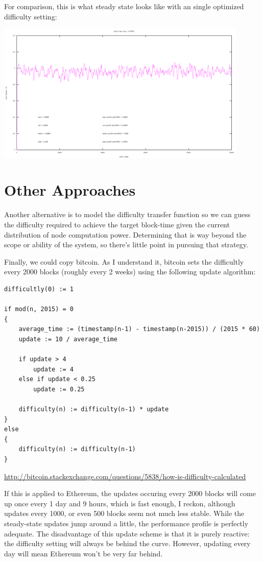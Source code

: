 \documentclass[10pt,a4paper]{article}
\begin{document}
\newpage

For comparison, this is what steady state looks like with an single optimized difficulty setting:
\begin{center}
\includegraphics[width=12cm]{SimulationGraphs/simulation_avg-500_upd-none.png}
\end{center}

\section*{Other Approaches}
	Another alternative is to model the difficulty transfer function so we can guess the difficulty required to achieve the target block-time given the current distribution of node computation power. Determining that is way beyond the scope or ability of the system, so there's little point in pursuing that strategy. 
	
	Finally, we could copy bitcoin. As I understand it, bitcoin sets the difficultly every 2000 blocks (roughly every 2 weeks) using the following update algorithm:
	
\begin{verbatim}
difficultly(0) := 1

if mod(n, 2015) = 0
{
    average_time := (timestamp(n-1) - timestamp(n-2015)) / (2015 * 60)
    update := 10 / average_time
	
    if update > 4
        update := 4
    else if update < 0.25
        update := 0.25
        
    difficulty(n) := difficulty(n-1) * update 
}
else
{
    difficulty(n) := difficulty(n-1)
}
\end{verbatim}

\url{http://bitcoin.stackexchange.com/questions/5838/how-is-difficulty-calculated}

\newpage

If this is applied to Ethereum, the updates occuring every 2000 blocks will come up once every 1 day and 9 hours, which is fast enough, I reckon, although updates every 1000, or even 500 blocks seem not much less stable. While the steady-state updates jump around a little, the performance profile is perfectly adequate. The disadvantage of this update scheme is that it is purely reactive: the difficulty setting will always be behind the curve. However, updating every day will mean Ethereum won't be very far behind.
\end{document}
